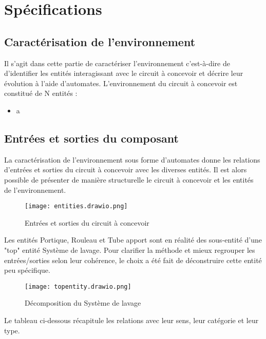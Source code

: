 \section{Spécifications}

\subsection{Caractérisation de l'environnement}

Il s'agit dans cette partie de caractériser l'environnement c'est-à-dire de d'identifier les entités interagissant avec le circuit à concevoir et décrire leur évolution à l'aide d'automates.
L'environnement du circuit à concevoir est constitué de N entités :

\begin{itemize}
	\item a
	
\end{itemize}

\subsection{Entrées et sorties du composant}

La caractérisation de l'environnement sous forme d'automates donne les relations d'entrées et sorties du circuit à concevoir avec les diverses entités.
Il est alors possible de présenter de manière structurelle le circuit à concevoir et les entités de l'environnement.

\begin{figure}[H]
	\centering
	\texttt{[image: entities.drawio.png]}
	\caption{Entrées et sorties du circuit à concevoir}
	\label{fig:entrees_sorties_composant}
\end{figure}

Les entités Portique, Rouleau et Tube apport sont en réalité des sous-entité d'une "top" entité Système de lavage.
Pour clarifier la méthode et mieux regrouper les entrées/sorties selon leur cohérence, le choix a été fait de déconstruire cette entité peu spécifique.

\begin{figure}[H]
	\centering
	\texttt{[image: topentity.drawio.png]}
	\caption{Décomposition du Système de lavage}
	\label{fig:decomp_entities}
\end{figure}

\newpage

Le tableau ci-dessous récapitule les relations avec leur sens, leur catégorie et leur type.

